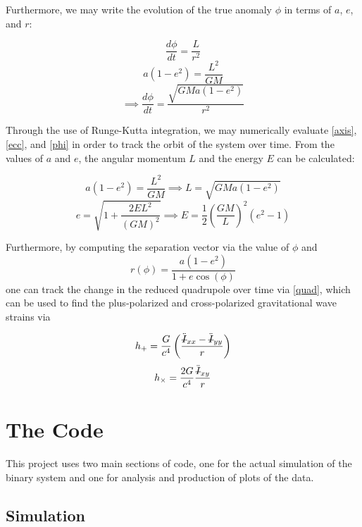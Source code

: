 \documentclass[preprint2]{aastex}
\newcommand{\Ibar}{\mbox{\st{$I$}}}
\begin{document}
Furthermore, we may write the evolution of the true anomaly \(\phi\) in terms of \(a\), \(e\), and \(r\):

\[
 \frac{d \phi}{dt} = \frac{L}{r^2}
\]
\[
a(1 - e^2) = \frac{L^2}{GM}
\]
\begin{equation} \label{phi}
\implies \frac{d \phi}{dt} = \frac{\sqrt{GMa(1 - e^2)}}{r^2}
\end{equation}

Through the use of Runge-Kutta integration, we may numerically evaluate \eqref{axis}, \eqref{ecc}, and \eqref{phi} in order to track the orbit of the system over time. From the values of \(a\) and \(e\), the angular momentum \(L\) and the energy \(E\) can be calculated:

\begin{equation} \label{momentum}
a(1 - e^2) = \frac{L^2}{GM} \implies L = \sqrt{GMa(1 - e^2)}
\end{equation}
\begin{equation} \label{energy}
e = \sqrt{1 + \frac{2EL^2}{(GM)^2}} \implies E = \frac{1}{2} \left( \frac{G M}{L} \right)^2 (e^2 - 1)
\end{equation}

Furthermore, by computing the separation vector via the value of \(\phi\) and
\begin{equation} \label{r}
r(\phi) = \frac{a(1-e^2)}{1 + e \cos(\phi)}
\end{equation}
one can track the change in the reduced quadrupole over time via \eqref{quad}, which can be used to find the plus-polarized and cross-polarized gravitational wave strains via

\begin{equation} \label{hplus}
h_+ = \frac{G}{c^4} \left( \frac{\ddot{\Ibar}_{xx} - \ddot{\Ibar}_{yy}}{r} \right)
\end{equation}
\begin{equation} \label{hcross}
 h_{\times} = \frac{2G}{c^4} \frac{\ddot{\Ibar}_{xy}}{r}
\end{equation}

\section{The Code}

This project uses two main sections of code, one for the actual simulation of the binary system and one for analysis and production of plots of the data.

\subsection{Simulation}
\end{document}
